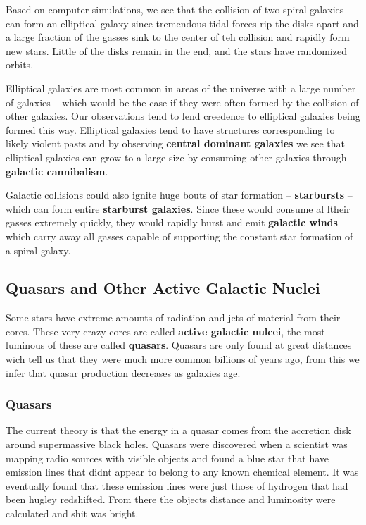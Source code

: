 Based on computer simulations, we see that the collision of two spiral galaxies can form an elliptical galaxy since tremendous tidal forces rip the disks apart and a large fraction of the gasses sink to the center of teh collision and rapidly form new stars. Little of the disks remain in the end, and the stars have randomized orbits.

Elliptical galaxies are most common in areas of the universe with a large number of galaxies -- which would be the case if they were often formed by the collision of other galaxies. Our observations tend to lend creedence to elliptical galaxies being formed this way. Elliptical galaxies tend to have structures corresponding to likely violent pasts and by observing {\bf central dominant galaxies} we see that elliptical galaxies can grow to a large size by consuming other galaxies through {\bf galactic cannibalism}.

Galactic collisions could also ignite huge bouts of star formation -- {\bf starbursts} -- which can form entire {\bf starburst galaxies}. Since these would consume al ltheir gasses extremely quickly, they would rapidly burst and emit {\bf galactic winds} which carry away all gasses capable of supporting the constant star formation of a spiral galaxy.

\subsection{Quasars and Other Active Galactic Nuclei}
Some stars have extreme amounts of radiation and jets of material from their cores. These very crazy cores are called \textbf{active galactic nulcei}, the most luminous of these are called \textbf{quasars}. Quasars are only found at great distances wich tell us that they were much more common billions of years ago, from this we infer that quasar production decreases as galaxies age.

\subsubsection{Quasars}
The current theory is that the energy in a quasar comes from the accretion disk around supermassive black holes. Quasars were discovered when a scientist was mapping radio sources with visible objects and found a blue star that have emission lines that didnt appear to belong to any known chemical element. It was eventually found that these emission lines were just those of hydrogen that had been hugley redshifted. From there the objects distance and luminosity were calculated and shit was bright.

